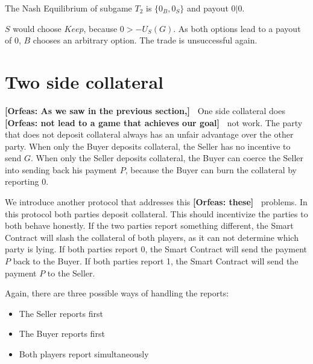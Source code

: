 \documentclass{cacthesis}
\newcommand{\authnote}[3]{{ \footnotesize \textbf{#1[#2: #3]~}}}
\newcommand{\orfnote}[1]{\authnote{\color{blue}}{Orfeas}{#1}}
\begin{document}
The Nash Equilibrium of subgame $T_2$ is $\{0_B, 0_S\}$ and payout $0 | 0$. \newline

$S$ would choose $Keep$, because $0>-U_S(G)$.\newline
As both options lead to a payout of 0, $B$ chooses an arbitrary option. The trade is unsuccessful again.


\section{Two side collateral}
\label{sec:two-side-collateral}
\orfnote{As we saw in the previous section,} One side collateral does
\orfnote{not lead to a game that achieves our goal} not work. The party that does not deposit collateral always has an unfair advantage over the other party. \newline
When only the Buyer deposits collateral, the Seller has no incentive to send $G$. \newline
When only the Seller deposits collateral, the Buyer can coerce the Seller into sending back his payment $P$, because the Buyer can burn the collateral by reporting 0.\newline 

We introduce another protocol that addresses this \orfnote{these} problems. In this protocol both parties deposit collateral. This should incentivize the parties to both behave honestly.\newline
If the two parties report something different, the Smart Contract will slash the collateral of both players, as it can not determine which party is lying. If both parties report 0, the Smart Contract will send the payment $P$ back to the Buyer. If both parties report 1, the Smart Contract will send the payment $P$ to the Seller.  \newline

Again, there are three possible ways of handling the reports:
\begin{itemize}
    \item The Seller reports first
    \item The Buyer reports first
    \item Both players report simultaneously
\end{itemize}
\end{document}
